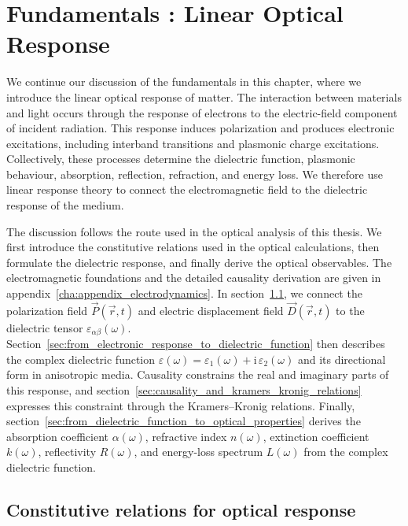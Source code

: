 \chapter{Fundamentals : Linear Optical Response}
\label{cha:fundamentals_b}

We continue our discussion of the fundamentals in this chapter, where we introduce the linear optical response of matter.
The interaction between materials and light occurs through the response of electrons to the electric-field component of incident radiation.
This response induces polarization and produces electronic excitations, including interband transitions and plasmonic charge excitations.
Collectively, these processes determine the dielectric function, plasmonic behaviour, absorption, reflection, refraction, and energy loss.
We therefore use linear response theory to connect the electromagnetic field to the dielectric response of the medium.

The discussion follows the route used in the optical analysis of this thesis.
We first introduce the constitutive relations used in the optical calculations, then formulate the dielectric response, and finally derive the optical observables.
The electromagnetic foundations and the detailed causality derivation are given in appendix~\ref{cha:appendix_electrodynamics}.
In section~\ref{sec:constitutive_relations_for_optical_response}, we connect the polarization field $\vec{P}(\vec{r},t)$ and electric displacement field $\vec{D}(\vec{r},t)$ to the dielectric tensor $\varepsilon_{\alpha\beta}(\omega)$.
Section~\ref{sec:from_electronic_response_to_dielectric_function} then describes the complex dielectric function $\varepsilon(\omega)=\varepsilon_1(\omega)+\mathrm{i}\,\varepsilon_2(\omega)$ and its directional form in anisotropic media.
Causality constrains the real and imaginary parts of this response, and section~\ref{sec:causality_and_kramers_kronig_relations} expresses this constraint through the Kramers--Kronig relations.
Finally, section~\ref{sec:from_dielectric_function_to_optical_properties} derives the absorption coefficient $\alpha(\omega)$, refractive index $n(\omega)$, extinction coefficient $k(\omega)$, reflectivity $R(\omega)$, and energy-loss spectrum $L(\omega)$ from the complex dielectric function.

\newpage
\section{Constitutive relations for optical response}
\label{sec:constitutive_relations_for_optical_response}

